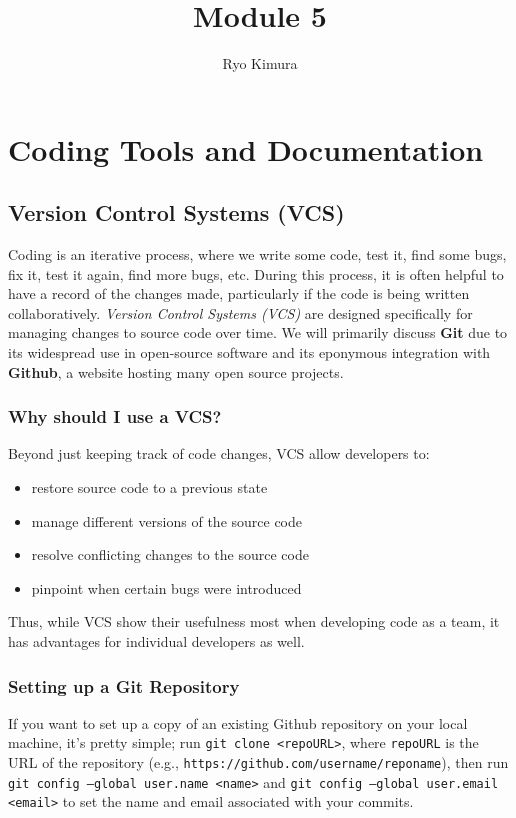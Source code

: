 \documentclass[12pt]{article}
\begin{document}
\title{Module 5}
\author{Ryo Kimura}
\date{}
\maketitle

\setcounter{section}{4}
\section{Coding Tools and Documentation}
\subsection{Version Control Systems (VCS)}
Coding is an iterative process, where we write some code, test it, find some bugs, fix it, test it again, find more bugs, etc. During this process, it is often helpful to have a record of the changes made, particularly if the code is being written collaboratively. \emph{Version Control Systems (VCS)} are designed specifically for managing changes to source code over time. We will primarily discuss \textbf{Git} due to its widespread use in open-source software and its eponymous integration with \textbf{Github}, a website hosting many open source projects.

\subsubsection{Why should I use a VCS?}
Beyond just keeping track of code changes, VCS allow developers to:
\begin{itemize}
    \item restore source code to a previous state
    \item manage different versions of the source code
    \item resolve conflicting changes to the source code
    \item pinpoint when certain bugs were introduced
\end{itemize}
Thus, while VCS show their usefulness most when developing code as a team, it has advantages for individual developers as well.

\subsubsection{Setting up a Git Repository}
If you want to set up a copy of an existing Github repository on your local machine, it's pretty simple; run \texttt{git clone <repoURL>}, where \texttt{repoURL} is the URL of the repository (e.g., \nolinkurl{https://github.com/username/reponame}), then run \texttt{git config --global user.name <name>} and \texttt{git config --global user.email <email>} to set the name and email associated with your commits.
\end{document}
